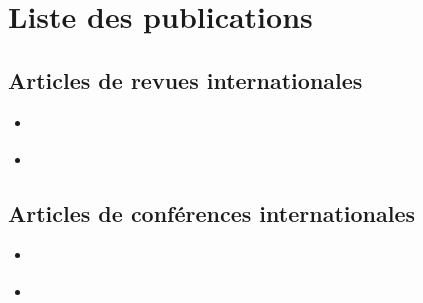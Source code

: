 \newpage
\section*{Liste des publications}

\subsection*{Articles de revues internationales}

\begin{itemize}
	\item {} \cite{Rajaona2015}
	\item {} \cite{Nguyen2016b}
\end{itemize}

\subsection*{Articles de conférences internationales}
\begin{itemize}
	\item {} \cite{Rajaona2014}
	\item {} \cite{Rajaona2016}
\end{itemize}